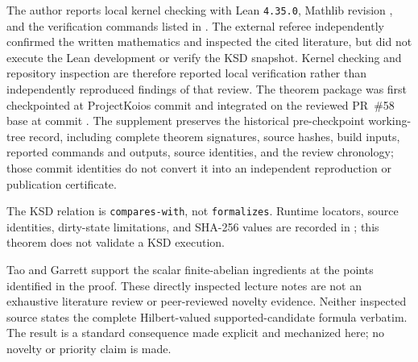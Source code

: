 \documentclass[11pt]{article}
\begin{document}
The author reports local kernel checking with Lean \texttt{4.35.0}, Mathlib revision
, and the verification commands listed in
.
The external referee independently confirmed the written mathematics and inspected the cited
literature, but did not execute the Lean development or verify the KSD snapshot.  Kernel checking
and repository inspection are therefore reported local verification rather than independently
reproduced findings of that review.  The theorem package was first checkpointed at ProjectKoios
commit
 and integrated on the reviewed PR~\#58 base at
commit .  The supplement preserves the historical
pre-checkpoint working-tree record, including complete theorem signatures, source hashes, build
inputs, reported commands and outputs, source identities, and the review chronology; those commit
identities do not convert it into an independent reproduction or publication certificate.

The KSD relation is \texttt{compares-with}, not \texttt{formalizes}.  Runtime locators, source
identities, dirty-state limitations, and SHA-256 values are recorded in
; this theorem does not
validate a KSD execution.

Tao and Garrett support the scalar finite-abelian ingredients at the points identified in the
proof.  These directly inspected lecture notes are not an exhaustive literature review or
peer-reviewed novelty evidence.  Neither inspected source states the complete Hilbert-valued
supported-candidate formula verbatim.  The result is a standard consequence made explicit and
mechanized here; no novelty or priority claim is made.
\end{document}
